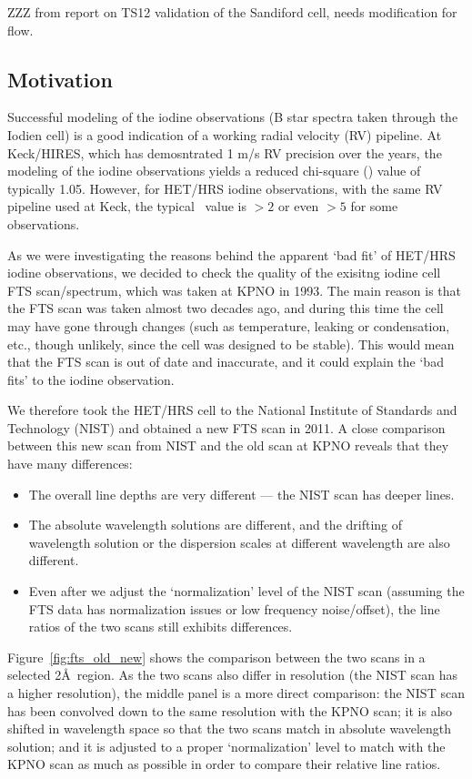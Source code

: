 
ZZZ from report on TS12 validation of the Sandiford cell, needs
modification for flow.

\subsection{Motivation}

Successful modeling of the iodine observations (B star spectra taken
through the Iodien cell) is a good indication of a working radial
velocity (RV) pipeline. At Keck/HIRES, which has demosntrated 1 m/s RV
precision over the years, the modeling of the iodine observations
yields a reduced chi-square (\chisq) value of typically 1.05. However,
for HET/HRS iodine observations, with the same RV pipeline used at
Keck, the typical \chisq\ value is $>2$ or even $>5$ for some
observations.

As we were investigating the reasons behind the apparent `bad fit' of
HET/HRS iodine observations, we decided to check the quality of the
exisitng iodine cell FTS scan/spectrum, which was taken at KPNO in
1993. The main reason is that the FTS scan was taken almost two
decades ago, and during this time the cell may have gone through
changes (such as temperature, leaking or condensation, etc., though
unlikely, since the cell was designed to be stable).  This would mean
that the FTS scan is out of date and inaccurate, and it could explain
the `bad fits' to the iodine observation.

We therefore took the HET/HRS cell to the National Institute of
Standards and Technology (NIST) and obtained a new FTS scan in 2011. A
close comparison between this new scan from NIST and the old scan at
KPNO reveals that they have many differences:
\begin{itemize}
  \item The overall line depths are very different --- the NIST scan
    has deeper lines.
  \item The absolute wavelength solutions are different, and the
    drifting of wavelength solution or the dispersion scales at
    different wavelength are also different.
  \item Even after we adjust the `normalization' level of the NIST
    scan (assuming the FTS data has normalization issues or low
    frequency noise/offset), the line ratios of the two scans still
    exhibits differences.
\end{itemize}

Figure~\ref{fig:fts_old_new} shows the comparison between the two
scans in a selected 2\AA\ region. As the two scans also differ in
resolution (the NIST scan has a higher resolution), the middle panel
is a more direct comparison: the NIST scan has been convolved down to
the same resolution with the KPNO scan; it is also shifted in
wavelength space so that the two scans match in absolute wavelength
solution; and it is adjusted to a proper `normalization' level to
match with the KPNO scan as much as possible in order to compare their
relative line ratios.

